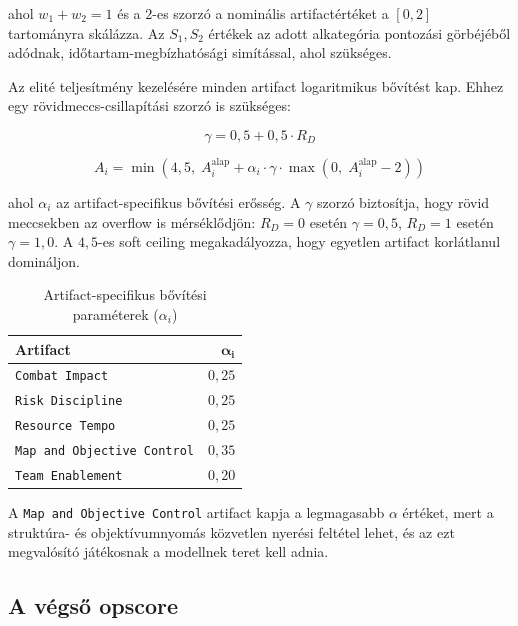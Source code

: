 ﻿\documentclass[a4paper,12pt]{report}
\begin{document}
ahol $w_1 + w_2 = 1$ és a $2$-es szorzó a nominális artifactértéket a $[0, 2]$ tartományra skálázza. Az $S_1, S_2$ értékek az adott alkategória pontozási görbéjéből adódnak, időtartam-megbízhatósági simítással, ahol szükséges.

Az elité teljesítmény kezelésére minden artifact logaritmikus bővítést kap. Ehhez egy rövidmeccs-csillapítási szorzó is szükséges:

\begin{equation}
\gamma = 0{,}5 + 0{,}5 \cdot R_D
\end{equation}

\begin{equation}
A_i = \min\!\left(4{,}5,\; A_i^{\text{alap}} + \alpha_i \cdot \gamma \cdot \max\!\left(0,\; A_i^{\text{alap}} - 2\right)\right)
\end{equation}

ahol $\alpha_i$ az artifact-specifikus bővítési erősség. A $\gamma$ szorzó biztosítja, hogy rövid meccsekben az overflow is mérséklődjön: $R_D = 0$ esetén $\gamma = 0{,}5$, $R_D = 1$ esetén $\gamma = 1{,}0$. A $4{,}5$-es soft ceiling megakadályozza, hogy egyetlen artifact korlátlanul domináljon.

\begin{table}[H]
\centering
\caption{Artifact-specifikus bővítési paraméterek ($\alpha_i$)}
\label{tab:overflow_params}
\begin{tabular}{lr}
\toprule
\textbf{Artifact} & $\boldsymbol{\alpha_i}$ \\
\midrule
\texttt{Combat Impact}             & $0{,}25$ \\
\texttt{Risk Discipline}           & $0{,}25$ \\
\texttt{Resource Tempo}            & $0{,}25$ \\
\texttt{Map and Objective Control} & $0{,}35$ \\
\texttt{Team Enablement}           & $0{,}20$ \\
\bottomrule
\end{tabular}
\end{table}

A \texttt{Map and Objective Control} artifact kapja a legmagasabb $\alpha$ értéket, mert a struktúra- és objektívumnyomás közvetlen nyerési feltétel lehet, és az ezt megvalósító játékosnak a modellnek teret kell adnia.

\subsection{A végső opscore}
\end{document}
